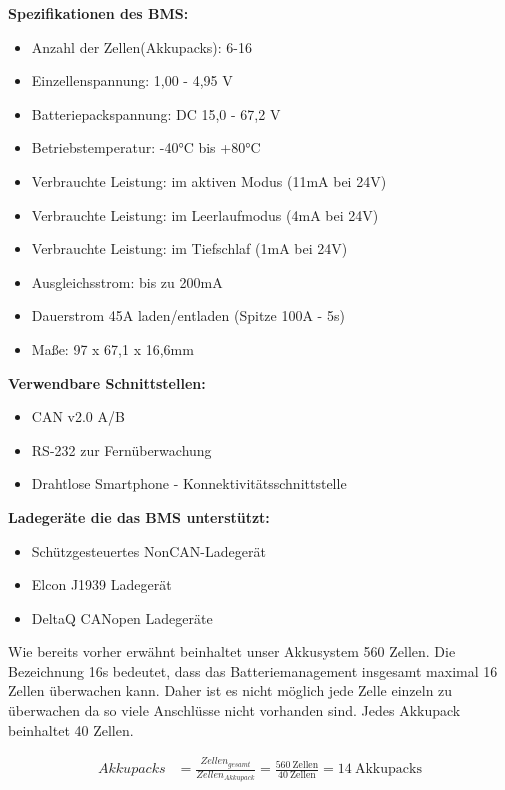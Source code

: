 \newpage
\textbf{Spezifikationen des BMS:}
\begin{itemize}
\item {Anzahl der Zellen(Akkupacks): 6-16}
\item {Einzellenspannung: 1,00 - 4,95 V}
\item {Batteriepackspannung: DC 15,0 - 67,2 V}
\item {Betriebstemperatur: -40°C bis +80°C}
\item {Verbrauchte Leistung: im aktiven Modus (11mA bei 24V)}
\item {Verbrauchte Leistung: im Leerlaufmodus (4mA bei 24V)}
\item {Verbrauchte Leistung: im Tiefschlaf (1mA bei 24V)}
\item {Ausgleichsstrom: bis zu 200mA}
\item {Dauerstrom 45A laden/entladen (Spitze 100A - 5s)}
\item {Maße: 97 x 67,1 x 16,6mm}
\end{itemize}


\textbf{Verwendbare Schnittstellen:}
\begin{itemize}
\item {CAN v2.0 A/B}
\item {RS-232 zur Fernüberwachung}
\item {Drahtlose Smartphone - Konnektivitätsschnittstelle}
\end{itemize}


\textbf{Ladegeräte die das BMS unterstützt:}
\begin{itemize}
\item {Schützgesteuertes NonCAN-Ladegerät}
\item {Elcon J1939 Ladegerät}
\item {DeltaQ CANopen Ladegeräte}
\end{itemize}

Wie bereits vorher erwähnt beinhaltet unser Akkusystem 560 Zellen. Die Bezeichnung 16s bedeutet, dass das Batteriemanagement insgesamt maximal 16 Zellen überwachen kann. Daher ist es nicht möglich jede Zelle einzeln zu überwachen da so viele Anschlüsse nicht vorhanden sind. Jedes Akkupack beinhaltet 40 Zellen.

\begin{align*}
Akkupacks &= \frac{Zellen_{gesamt}}{Zellen_{Akkupack}} = \frac{560~\mathrm{Zellen}}{40~\mathrm{Zellen}} = 14~\mathrm{Akkupacks}\\
\end{align*}

\newpage
